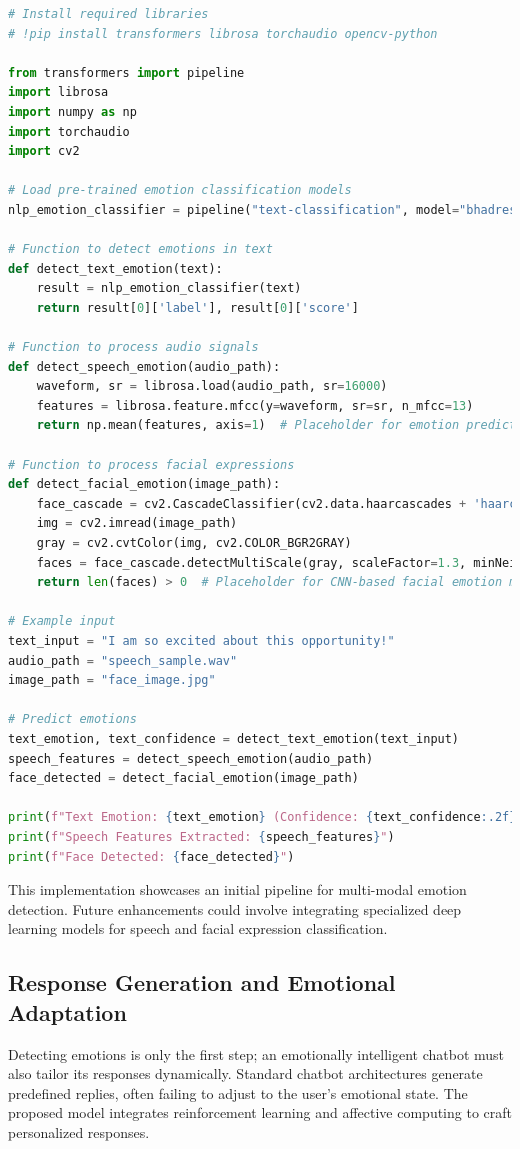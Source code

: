 \documentclass[a4paper,10pt]{article}
\begin{document}
\begin{lstlisting}[language=Python, caption=Multi-Modal Emotion Detection, label=lst:multi_modal_emotion]
# Install required libraries
# !pip install transformers librosa torchaudio opencv-python

from transformers import pipeline
import librosa
import numpy as np
import torchaudio
import cv2

# Load pre-trained emotion classification models
nlp_emotion_classifier = pipeline("text-classification", model="bhadresh-savani/distilbert-base-uncased-emotion")

# Function to detect emotions in text
def detect_text_emotion(text):
    result = nlp_emotion_classifier(text)
    return result[0]['label'], result[0]['score']

# Function to process audio signals
def detect_speech_emotion(audio_path):
    waveform, sr = librosa.load(audio_path, sr=16000)
    features = librosa.feature.mfcc(y=waveform, sr=sr, n_mfcc=13)
    return np.mean(features, axis=1)  # Placeholder for emotion prediction model

# Function to process facial expressions
def detect_facial_emotion(image_path):
    face_cascade = cv2.CascadeClassifier(cv2.data.haarcascades + 'haarcascade_frontalface_default.xml')
    img = cv2.imread(image_path)
    gray = cv2.cvtColor(img, cv2.COLOR_BGR2GRAY)
    faces = face_cascade.detectMultiScale(gray, scaleFactor=1.3, minNeighbors=5)
    return len(faces) > 0  # Placeholder for CNN-based facial emotion model

# Example input
text_input = "I am so excited about this opportunity!"
audio_path = "speech_sample.wav"
image_path = "face_image.jpg"

# Predict emotions
text_emotion, text_confidence = detect_text_emotion(text_input)
speech_features = detect_speech_emotion(audio_path)
face_detected = detect_facial_emotion(image_path)

print(f"Text Emotion: {text_emotion} (Confidence: {text_confidence:.2f})")
print(f"Speech Features Extracted: {speech_features}")
print(f"Face Detected: {face_detected}")
\end{lstlisting}

This implementation showcases an initial pipeline for multi-modal emotion detection. Future enhancements could involve integrating specialized deep learning models for speech and facial expression classification.

\subsection{Response Generation and Emotional Adaptation}
Detecting emotions is only the first step; an emotionally intelligent chatbot must also tailor its responses dynamically. Standard chatbot architectures generate predefined replies, often failing to adjust to the user’s emotional state. The proposed model integrates reinforcement learning and affective computing to craft personalized responses.
\end{document}
